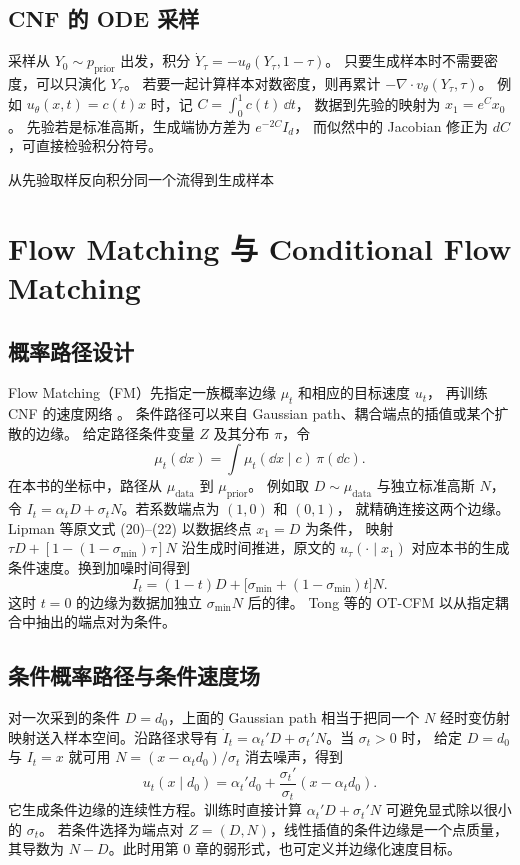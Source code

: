 \subsection{CNF 的 ODE 采样}

采样从 \(Y_0\sim p_{\mathrm{prior}}\) 出发，积分
\(\dot Y_\tau=-u_\theta(Y_\tau,1-\tau)\)。
只要生成样本时不需要密度，可以只演化 \(Y_\tau\)。
若要一起计算样本对数密度，则再累计
\(-\nabla\cdot v_\theta(Y_\tau,\tau)\)。
例如 \(u_\theta(x,t)=c(t)x\) 时，记 \(C=\int_0^1c(t)\,\dd t\)，
数据到先验的映射为 \(x_1=e^Cx_0\)。
先验若是标准高斯，生成端协方差为 \(e^{-2C}I_d\)，
而似然中的 Jacobian 修正为 \(dC\)，可直接检验积分符号。

  {从先验取样}{反向积分同一个流}{得到生成样本}
\section{Flow Matching 与 Conditional Flow Matching}
\label{sec:overview-flow-matching}

\subsection{概率路径设计}

Flow Matching（FM）先指定一族概率边缘 \(\mu_t\) 和相应的目标速度 \(u_t\)，
再训练 CNF 的速度网络 \cite{lipman2023fm}。
条件路径可以来自 Gaussian path、耦合端点的插值或某个扩散的边缘。
给定路径条件变量 \(Z\) 及其分布 \(\pi\)，令
\[
  \mu_t(\dd x)=\int\mu_t(\dd x\mid c)\,\pi(\dd c).
\]
在本书的坐标中，路径从 \(\mu_{\mathrm{data}}\) 到 \(\mu_{\mathrm{prior}}\)。
例如取 \(D\sim\mu_{\mathrm{data}}\) 与独立标准高斯 \(N\)，令
\(I_t=\alpha_tD+\sigma_tN\)。若系数端点为 \((1,0)\) 和 \((0,1)\)，
就精确连接这两个边缘。Lipman 等原文式 (20)--(22) 以数据终点 \(x_1=D\) 为条件，
映射 \(\tau D+[1-(1-\sigma_{\min})\tau]N\) 沿生成时间推进，原文的
\(u_\tau(\cdot\mid x_1)\) 对应本书的生成条件速度。换到加噪时间得到
\[
  I_t=(1-t)D+\bigl[\sigma_{\min}+(1-\sigma_{\min})t\bigr]N .
\]
这时 \(t=0\) 的边缘为数据加独立 \(\sigma_{\min}N\) 后的律。
Tong 等的 OT-CFM 以从指定耦合中抽出的端点对为条件。

\subsection{条件概率路径与条件速度场}

对一次采到的条件 \(D=d_0\)，上面的 Gaussian path 相当于把同一个
\(N\) 经时变仿射映射送入样本空间。沿路径求导有
\(\dot I_t=\alpha_t'D+\sigma_t'N\)。当 \(\sigma_t>0\) 时，
给定 \(D=d_0\) 与 \(I_t=x\) 就可用
\(N=(x-\alpha_td_0)/\sigma_t\) 消去噪声，得到
\begin{equation}
  u_t(x\mid d_0)=\alpha_t'd_0
                   +\frac{\sigma_t'}{\sigma_t}(x-\alpha_td_0).
  \label{eq:overview-fm-conditional}
\end{equation}
它生成条件边缘的连续性方程。训练时直接计算
\(\alpha_t'D+\sigma_t'N\) 可避免显式除以很小的 \(\sigma_t\)。
若条件选择为端点对 \(Z=(D,N)\)，线性插值的条件边缘是一个点质量，
其导数为 \(N-D\)。此时用第 0 章的弱形式，也可定义并边缘化速度目标。

